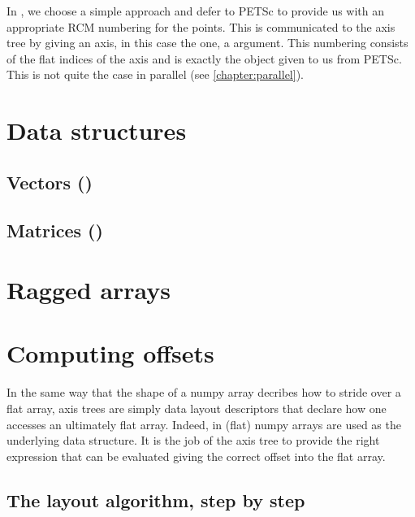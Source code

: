 \documentclass[thesis]{subfiles}
\begin{document}
In , we choose a simple approach and defer to PETSc to provide us with an appropriate RCM numbering for the points.
This is communicated to the axis tree by giving an axis, in this case the  one, a  argument.
This numbering consists of the flat indices of the axis and is exactly the object given to us from PETSc.
This is not quite the case in parallel (see \cref{chapter:parallel}).

\section{Data structures}
\label{sec:data_structures}

\subsection{Vectors ()}

\subsection{Matrices ()}

\section{Ragged arrays}


\section{Computing offsets}

In the same way that the shape of a numpy array decribes how to stride over a flat array, axis trees are simply data layout descriptors that declare how one accesses an ultimately flat array.
Indeed, in  (flat) numpy arrays are used as the underlying data structure.
It is the job of the axis tree to provide the right expression that can be evaluated giving the correct offset into the flat array.


\subsection{The layout algorithm, step by step}

\end{document}
